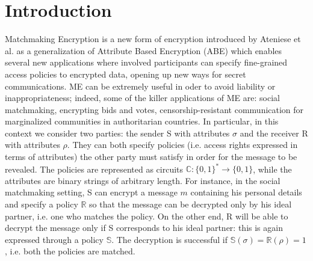 \chapter{Introduction}
Matchmaking Encryption is a new form of encryption introduced by Ateniese et al. \cite{Ateniese} as a generalization of  Attribute Based Encryption (ABE)  \cite{Sahai} which enables several new applications where involved participants can specify fine-grained access policies to encrypted data, opening up new ways for secret communications. ME can be extremely useful in oder to avoid liability or inappropriateness; indeed, some of the killer applications of ME are: social matchmaking, encrypting bids and votes, censorship-resistant communication for marginalized communities in authoritarian countries.
\newline\newline
In particular, in this context we consider two parties: the sender S with attributes $\sigma$ and the receiver R with attributes $\rho$.
They can both specify policies (i.e. access rights expressed in terms of attributes) the other party must satisfy in order for the message to be revealed. The policies are represented as circuits $\mathbb{C} : \{0, 1\}^* \to \{0, 1\}$, while the attributes are binary strings of arbitrary length.
For instance, in the social matchmaking setting, S can encrypt a message $m$ containing his personal details and specify a policy $\mathbb{R}$ so that the message can be decrypted only by his ideal partner, i.e. one who matches the policy. On the other end, R will be able to decrypt the message only if S corresponds to his ideal partner: this is again expressed through a policy $\mathbb{S}$. The decryption is successful if $\mathbb{S}(\sigma) = \mathbb{R}(\rho) = 1$, i.e. both the policies are matched.

